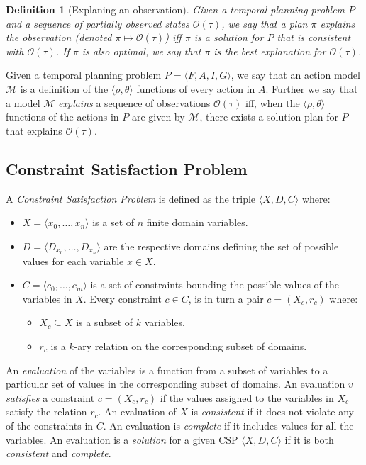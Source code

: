 \documentclass[letterpaper]{article} %
\newcommand{\tup}[1]{{\langle #1 \rangle}}
\newtheorem{definition}[theorem]{Definition}
\begin{document}
\begin{definition}[Explaning an observation]
Given a {\em temporal planning problem} $P$ and a sequence of partially observed states $\mathcal{O}(\tau)$, we say that a plan $\pi$ {\em explains the observation} (denoted $\pi\mapsto\mathcal{O}(\tau)$) iff $\pi$ is a solution for $P$ that is consistent with $\mathcal{O}(\tau)$. If $\pi$ is also optimal, we say that $\pi$ is the {\em best explanation} for $\mathcal{O}(\tau)$. 
\end{definition}

Given a temporal planning problem $P=\tup{F,A,I,G}$, we say that an action model $\mathcal{M}$ is a definition of the $\tup{\rho,\theta}$ functions of every action in $A$. Further we say that a model $\mathcal{M}$ {\em explains} a sequence of observations $\mathcal{O}(\tau)$ iff, when the $\tup{\rho,\theta}$ functions of the actions in $P$ are given by $\mathcal{M}$, there exists a solution plan for $P$ that explains $\mathcal{O}(\tau)$.


\subsection{Constraint Satisfaction Problem}
A {\em Constraint Satisfaction Problem} is defined as the triple $\tup{X,D,C}$ where:
\begin{itemize}
\item $X=\tup{x_0, \ldots, x_n}$ is a set of $n$ finite domain variables.
\item $D=\tup{D_{x_0}, \ldots, D_{x_n}}$ are the respective domains defining the set of possible values for each variable $x\in X$.
\item $C=\tup{c_0, \ldots, c_m}$ is a set of constraints bounding the possible values of the variables in $X$. Every constraint $c\in C$, is in turn a pair $c=(X_c,r_c)$ where:
\begin{itemize}
\item $X_c\subseteq X$ is a subset of $k$ variables.
\item $r_c$ is a $k$-ary relation on the corresponding subset of domains.
\end{itemize}
\end{itemize}

An {\em evaluation} of the variables is a function from a subset of variables to a particular set of values in the corresponding subset of domains. An evaluation $v$ {\em satisfies} a constraint $c=(X_c,r_c)$ if the values assigned to the variables in $X_c$ satisfy the relation $r_c$. An evaluation of $X$ is {\em consistent} if it does not violate any of the constraints in $C$. An evaluation is {\em complete} if it includes values for all the variables. An evaluation is a {\em solution} for a given CSP $\tup{X,D,C}$ if it is both {\em consistent} and {\em complete}. 
\end{document}
